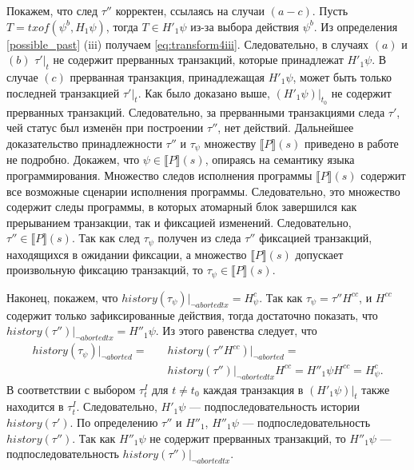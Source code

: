\begin{myproof}
Покажем, что след $\tau''$ корректен, ссылаясь на случаи $(a-c)$. Пусть $T = txof(\psi^b, H_1\psi)$, тогда $T \in H'_1\psi$ из-за выбора действия $\psi^b$. Из определения \ref{possible_past} (iii) получаем \eqref{eq:transform4iii}. Следовательно, в случаях $(a)$ и $(b)$ $\tau'|_t$ не содержит прерванных транзакций, которые принадлежат $H'_1\psi$. В случае $(c)$ прерванная транзакция, принадлежащая $H'_1\psi$, может быть только последней транзакцией $\tau'|_t$. Как было доказано выше, $(H'_1\psi)|_{t_0}$ не содержит прерванных транзакций. Следовательно, за прерванными транзакциями следа $\tau'$, чей статус был изменён при построении $\tau''$, нет действий. Дальнейшее доказательство принадлежности $\tau''$ и $\tau_{\psi}$ множеству  $\llbracket P\rrbracket(s)$ приведено в работе \cite{tms_article} не подробно. Докажем, что $\psi \in \llbracket P\rrbracket(s)$, опираясь на семантику языка программирования. Множество следов исполнения программы $\llbracket P\rrbracket(s)$ содержит все возможные сценарии исполнения программы. Следовательно, это множество содержит следы программы, в которых атомарный блок завершился как прерыванием транзакции, так и фиксацией изменений. Следовательно, $\tau'' \in \llbracket P\rrbracket(s)$. Так как след $\tau_{\psi}$ получен из следа $\tau''$ фиксацией транзакций, находящихся в ожидании фиксации, а множество $\llbracket P\rrbracket(s)$ допускает произвольную фиксацию транзакций, то  $\tau_{\psi} \in \llbracket P\rrbracket(s)$.

Наконец, покажем, что $history(\tau_{\psi})|_{\neg abortedtx} = H^c_{\psi}$. Так как $\tau_{\psi} = \tau''H^{cc}$, и $H^{cc}$ содержит только зафиксированные действия, тогда достаточно показать, что $history(\tau'')|_{\neg abortedtx} = H''_1\psi$. Из этого равенства следует, что
\begin{align*}
history(\tau_{\psi})|_{\neg aborted} = &\quad history(\tau''H^{cc})|_{\neg aborted} = \\
                                 &\quad history(\tau'')|_{\neg abortedtx}H^{cc} = H''_1{\psi}H^{cc} =H^c_{\psi}.
\end{align*}
В соответствии с выбором $\tau^I_t$ для $t \neq t_0$ каждая транзакция в $(H'_1\psi)|_t$ также находится в $\tau^I_t$. Следовательно, $H'_1\psi$ --- подпоследовательность истории $history(\tau')$. По определению $\tau''$ и $H''_1$, $H''_1\psi$ --- подпоследовательность $history(\tau'')$. Так как $H''_1\psi$ не содержит прерванных транзакций, то $H''_1\psi$ --- подпоследовательность $history(\tau'')|_{\neg abortedtx}$.


\end{myproof}
